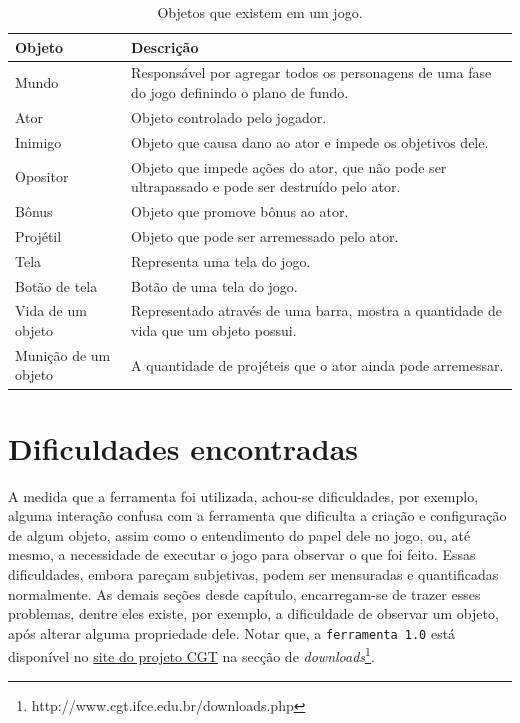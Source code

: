 \documentclass[12pt,oneside,openright,a4paper,english,brazil,sumario=tradicional]{abntex2}
\begin{document}
\begin{table}[htb]
\centering
\begin{tabular}{| l | p{7cm} |}
      \hline
      \textbf{Objeto} & \textbf{Descrição} \\
      \hline
      Mundo & Responsável por agregar todos os personagens de uma fase do jogo definindo o plano de fundo.  \\
      \hline
      Ator & Objeto controlado pelo jogador. \\
      \hline
      Inimigo & Objeto que causa dano ao ator e impede os objetivos dele. \\
      \hline
      Opositor & Objeto que impede ações do ator, que não pode ser ultrapassado e pode ser destruído pelo ator.  \\
      \hline
      Bônus & Objeto que promove bônus ao ator. \\
      \hline
      Projétil & Objeto que pode ser arremessado pelo ator. \\
      \hline
      Tela & Representa uma tela do jogo. \\
      \hline
      Botão de tela & Botão de uma tela do jogo. \\
      \hline
      Vida de um objeto & Representado através de uma barra, mostra a quantidade de vida que um objeto possui. \\
      \hline
      Munição de um objeto & A quantidade de projéteis que o ator ainda pode arremessar. \\
      \hline
   \end{tabular}
\caption{Objetos que existem em um jogo.}
\label{table:objetos-desc}
\end{table}

\section{Dificuldades encontradas}
\label{sec:dificuldades}
A medida que a ferramenta foi utilizada, achou-se dificuldades, por exemplo, alguma interação confusa com a ferramenta que dificulta a criação e configuração de algum objeto, assim como o entendimento do papel dele no jogo, ou, até mesmo, a necessidade de executar o jogo para observar o que foi feito. Essas dificuldades, embora pareçam subjetivas, podem ser mensuradas e quantificadas normalmente. As demais seções desde capítulo, encarregam-se de trazer esses problemas, dentre eles existe, por exemplo, a dificuldade de observar um objeto, após alterar alguma propriedade dele.
Notar que, a \texttt{ferramenta 1.0} está disponível no \href{http://www.cgt.ifce.edu.br/downloads.php}{site do projeto CGT} na secção de \emph{downloads}\footnote{http://www.cgt.ifce.edu.br/downloads.php}.
\end{document}
